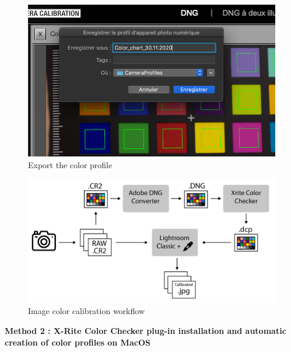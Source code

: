 \documentclass[
]{book}
\begin{document}
\begin{figure}

{\centering \includegraphics[width=0.8\linewidth]{Figures/create_profile} 

}

\caption{Export the color profile}\label{fig:ColorCheckerprofile}
\end{figure}

\begin{figure}

{\centering \includegraphics[width=0.8\linewidth]{Figures/manual_method} 

}

\caption{Image color calibration workflow}\label{fig:ColorCheckerworkflow}
\end{figure}

\textbf{Method 2 : X-Rite Color Checker plug-in installation and automatic
creation of color profiles on MacOS}
\end{document}
